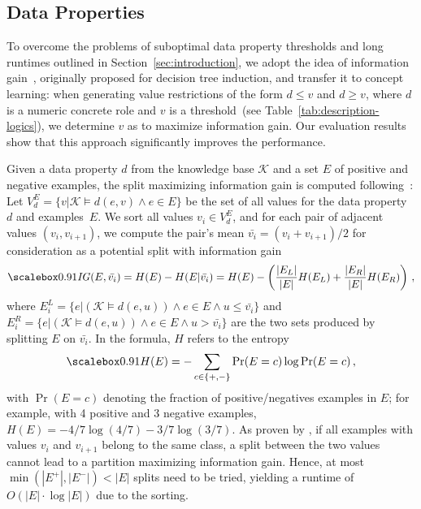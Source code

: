 \subsection{Data Properties}%
\label{subsec:data_properties}

To overcome the problems of suboptimal data property thresholds and long runtimes outlined in Section~\ref{sec:introduction}, we adopt the idea of information gain~\citep{Quinlan1986Induction}, originally proposed for decision tree induction, and transfer it to concept learning: when generating value restrictions of the form $d \leq v$ and $d \geq v$, where $d$ is a numeric concrete role and $v$ is a threshold~(see Table~\ref{tab:description-logics}), we determine $v$ as to maximize information gain. Our evaluation results show that this approach significantly improves the performance.

Given a data property $d$ from the knowledge base $\mathcal{K}$ and a set $E$ of positive and negative examples, the split maximizing information gain is computed following~\citet{Quinlan1986Induction}: Let $V_d^{E} = \{v | \mathcal{K} \models d(e,v) \wedge e \in E \}$ be the set of all values for the data property~$d$ and examples~$E$. We sort all values $v_i \in V_d^E$, and for each pair of adjacent values $(v_i, v_{i+1})$, we compute the pair's mean $\bar{v_i} = (v_i + v_{i+1})/2$ for consideration as a potential split with information gain
\begin{equation}
\scalemath{0.91}{%
	\mathit{IG}(E, \bar{v_i}) = H(E) - H(E|\bar{v_i})
   =  H(E) - \left(\frac{|E_L|}{|E|} H(E_L) + \frac{|E_R|}{|E|}  H(E_R)\right)\,,}
\end{equation}
where $E_i^L = \{e| \left(\mathcal{K} \models d(e, u)\right) \wedge e \in E \wedge u \leq \bar{v_i} \}$ and $E_i^R = \{e|\left(\mathcal{K} \models d(e, u)\right) \wedge e \in E \wedge u > \bar{v_i} \}$ are the two sets produced by splitting $E$ on $\bar{v_i}$. In the formula, $H$ refers to the entropy
\begin{equation}
\scalemath{0.91}{%
		H(E) = - \sum_{c \in \{+, -\}} \Pr(E = c) \log \Pr(E = c)\,,}
\end{equation}
with $\Pr(E=c)$ denoting the fraction of positive/negatives examples in $E$; for example, with 4 positive and 3 negative examples, $H(E) = -4/7 \log(4/7) - 3/7 \log(3/7)$.
As proven by \citet{Fayyad1992Handling}, if all examples with values $v_i$ and $v_{i+1}$ belong to the same class, a split between the two values cannot lead to a partition maximizing information gain. Hence, at most $\min(|E^{+}|, |E^{-}|) < |E|$ splits need to be tried, yielding a runtime of $O(|E| \cdot \log |E|)$ due to the sorting.

